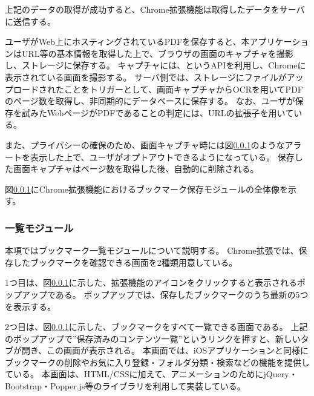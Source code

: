 上記のデータの取得が成功すると、Chrome拡張機能は取得したデータをサーバに送信する。

ユーザがWeb上にホスティングされているPDFを保存すると、本アプリケーションはURL等の基本情報を取得した上で、ブラウザの画面のキャプチャを撮影し、ストレージに保存する。
キャプチャには、というAPIを利用し、Chromeに表示されている画面を撮影する。
サーバ側では、ストレージにファイルがアップロードされたことをトリガーとして、画面キャプチャからOCRを用いてPDFのページ数を取得し、非同期的にデータベースに保存する。
なお、ユーザが保存を試みたWebページがPDFであることの判定には、URLの拡張子を用いている。

また、プライバシーの確保のため、画面キャプチャ時には図\ref{}のようなアラートを表示した上で、ユーザがオプトアウトできるようになっている。
保存した画面キャプチャはページ数を取得した後、自動的に削除される。

図\ref{}にChrome拡張機能におけるブックマーク保存モジュールの全体像を示す。

\subsubsection{一覧モジュール}
本項ではブックマーク一覧モジュールについて説明する。
Chrome拡張では、保存したブックマークを確認できる画面を2種類用意している。

1つ目は、図\ref{}に示した、拡張機能のアイコンをクリックすると表示されるポップアップである。
ポップアップでは、保存したブックマークのうち最新の5つを表示する。

2つ目は、図\ref{}に示した、ブックマークをすべて一覧できる画面である。
上記のポップアップで”保存済みのコンテンツ一覧”というリンクを押すと、新しいタブが開き、この画面が表示される。
本画面では、iOSアプリケーションと同様にブックマークの削除やお気に入り登録・フォルダ分類・検索などの機能を提供している。
本画面は、HTML/CSSに加えて、アニメーションのためにjQuery\cite{}・Bootstrap\cite{}・Popper.js\cite{}等のライブラリを利用して実装している。



